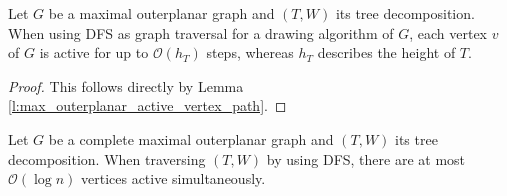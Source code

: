 \begin{lemma}
	Let $G$ be a maximal outerplanar graph and $(T,W)$ its tree decomposition. When using DFS as graph traversal for a drawing algorithm of $G$, each vertex $v$ of $G$ is active for up to $\mathcal{O}(h_{T})$ steps, whereas $h_T$ describes the height of $T$.\label{l:one_vertex_active_height}
\end{lemma}
\begin{proof}
	This follows directly by Lemma \ref{l:max_outerplanar_active_vertex_path}.
\end{proof}

\begin{lemma}\label{l:complete_maximal_outerplanar_log_n_active}
	Let $G$ be a complete maximal outerplanar graph and $(T,W)$ its tree decomposition. When traversing $(T,W)$ by using DFS, there are at most $\mathcal{O}(\log n)$ vertices active simultaneously.
\end{lemma}
